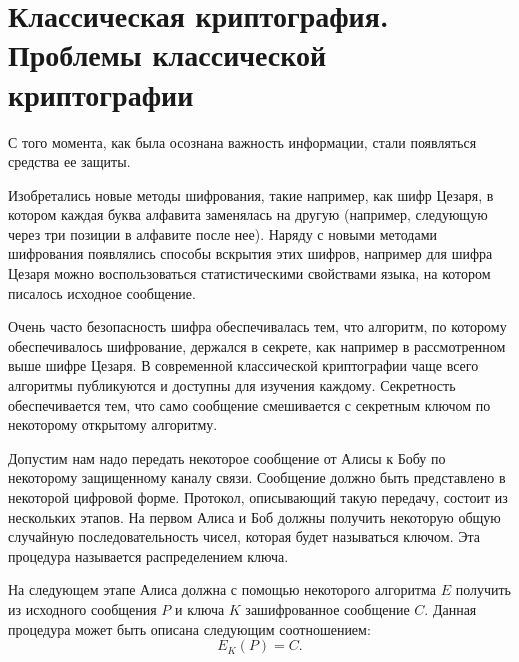 \section{Классическая криптография. Проблемы классической криптографии}
С того момента, как была осознана важность информации, стали появляться
средства ее защиты. 

Изобретались новые методы
шифрования, такие например, как шифр Цезаря, в котором каждая буква
алфавита заменялась на другую (например, следующую через три позиции в
алфавите после нее). Наряду с новыми методами шифрования появлялись
способы вскрытия этих шифров, например для шифра Цезаря можно
воспользоваться статистическими свойствами языка, на котором
писалось исходное сообщение.

Очень часто безопасность шифра обеспечивалась тем, что алгоритм, по
которому обеспечивалось шифрование, держался в секрете, как например в
рассмотренном выше шифре Цезаря. В современной классической
криптографии чаще всего алгоритмы
публикуются и доступны для изучения каждому. Секретность
обеспечивается тем, что само сообщение смешивается с секретным ключом
по некоторому открытому алгоритму. 

Допустим нам надо передать некоторое сообщение от Алисы к Бобу по
некоторому защищенному каналу связи. Сообщение должно быть
представлено в некоторой цифровой форме.
Протокол, описывающий такую
передачу, состоит из нескольких этапов. На первом Алиса и Боб должны
получить некоторую общую случайную последовательность чисел, которая
будет называться ключом. Эта процедура называется распределением
ключа. 

На следующем этапе Алиса должна с помощью
некоторого алгоритма $E$ получить из исходного сообщения $P$ и ключа $K$
зашифрованное сообщение $C$. Данная процедура может быть описана следующим
соотношением: 
\begin{equation}
E_{K}\left(P\right) = C.
\label{eqPart3CryptoEncryptClass}
\end{equation}

